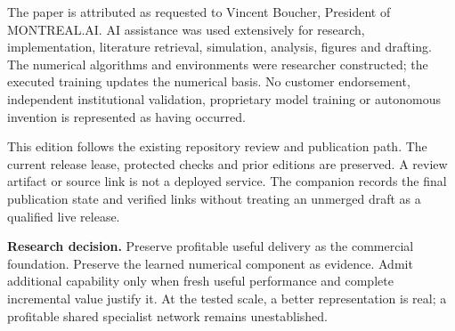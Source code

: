 \documentclass[11pt,letterpaper]{article}
\begin{document}
The paper is attributed as requested to Vincent Boucher, President of MONTREAL.AI. AI assistance was used extensively for research, implementation, literature retrieval, simulation, analysis, figures and drafting. The numerical algorithms and environments were researcher constructed; the executed training updates the numerical basis. No customer endorsement, independent institutional validation, proprietary model training or autonomous invention is represented as having occurred.

This edition follows the existing repository review and publication path. The current release lease, protected checks and prior editions are preserved. A review artifact or source link is not a deployed service. The companion records the final publication state and verified links without treating an unmerged draft as a qualified live release.

\begin{tcolorbox}[colback=pale,colframe=navy,arc=0pt,boxrule=0.5pt]
\textbf{Research decision.} Preserve profitable useful delivery as the commercial foundation. Preserve the learned numerical component as evidence. Admit additional capability only when fresh useful performance and complete incremental value justify it. At the tested scale, a better representation is real; a profitable shared specialist network remains unestablished.
\end{tcolorbox}



\end{document}
